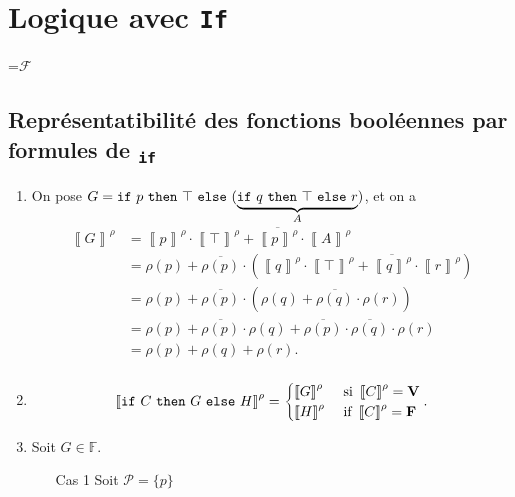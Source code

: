 \section{Logique avec \texttt{If}}

\setbox\tmpbox=\hbox{\Large $\mathbf{\mathcal{F}}$}
\subsection{Représentatibilité des fonctions booléennes par formules de \box\tmpbox\!\textsubscript{\texttt{if}}}

\begin{enumerate}
	\item On pose $G = {\tt if}\/\ p\ {\tt then}\/\ \top\ {\tt else}\/\ (\underbrace{{\tt if}\/\ q\ {\tt then}\/\ \top\ {\tt else}\/\ r}_{A})$, et on a
		\begin{align*}
			\left\llbracket G \right\rrbracket^\rho
			&= \left\llbracket p \right\rrbracket^\rho \cdot \left\llbracket \top \right\rrbracket^\rho + \overline{\left\llbracket p \right\rrbracket^\rho}  \cdot \left\llbracket A \right\rrbracket^\rho \\
			&= \rho(p) + \overline{\rho(p)} \cdot  \left( \left\llbracket q \right\rrbracket^\rho \cdot \left\llbracket \top \right\rrbracket^\rho + \overline{\left\llbracket q \right\rrbracket^\rho} \cdot \left\llbracket r \right\rrbracket^\rho \right) \\
			&= \rho(p) + \overline{\rho(p)} \cdot  \left( \rho(q) + \overline{\rho(q)} \cdot \rho(r) \right) \\
			&= \rho(p) + \overline{\rho(p)}\cdot \rho(q) + \overline{\rho(p)} \cdot  \overline{\rho(q)} \cdot \rho(r) \\
			&= \rho(p) + \rho(q) + \rho(r). \\
		\end{align*}
	\item \[
			\left\llbracket {\tt if}\/\ C\ {\tt then}\/\ G\ {\tt else}\/\ H \right\rrbracket^\rho = \begin{cases}
				\left\llbracket G \right\rrbracket^\rho &\text{ si }\left\llbracket C \right\rrbracket^\rho = {\mathbf{V}}\\
				\left\llbracket H \right\rrbracket^\rho &\text{ if } \left\llbracket C \right\rrbracket^\rho = {\mathbf{F}}
			\end{cases}
		.\]
	\item Soit $G \in \mathds{F}$.
		\begin{itemize}
			\item[Cas 1] Soit $\mathcal{P} = \{p\}$\/

\end{itemize}
\end{enumerate}
